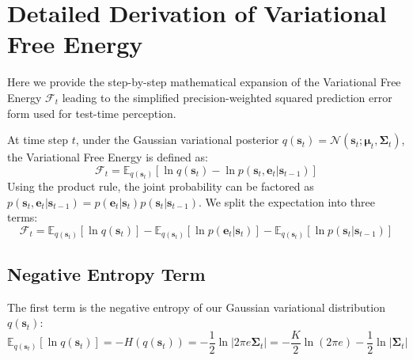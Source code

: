 \documentclass{article}
\theoremstyle{plain}
\theoremstyle{definition}
\theoremstyle{remark}
\begin{document}










\newpage
\appendix
\onecolumn

\section{Detailed Derivation of Variational Free Energy}
\label{app:derivation}

Here we provide the step-by-step mathematical expansion of the Variational Free Energy $\mathcal{F}_t$ leading to the simplified precision-weighted squared prediction error form used for test-time perception. 

At time step $t$, under the Gaussian variational posterior $q(\mathbf{s}_t) = \mathcal{N}(\mathbf{s}_t; \mathbf{\mu}_t, \mathbf{\Sigma}_t)$, the Variational Free Energy is defined as:
\begin{equation}
\mathcal{F}_t = \mathbb{E}_{q(\mathbf{s}_t)} \left[ \ln q(\mathbf{s}_t) - \ln p(\mathbf{s}_t, \mathbf{e}_t | \mathbf{s}_{t-1}) \right]
\end{equation}
Using the product rule, the joint probability can be factored as $p(\mathbf{s}_t, \mathbf{e}_t | \mathbf{s}_{t-1}) = p(\mathbf{e}_t | \mathbf{s}_t) p(\mathbf{s}_t | \mathbf{s}_{t-1})$. We split the expectation into three terms:
\begin{equation}
\mathcal{F}_t = \mathbb{E}_{q(\mathbf{s}_t)} [ \ln q(\mathbf{s}_t) ] - \mathbb{E}_{q(\mathbf{s}_t)} [ \ln p(\mathbf{e}_t | \mathbf{s}_t) ] - \mathbb{E}_{q(\mathbf{s}_t)} [ \ln p(\mathbf{s}_t | \mathbf{s}_{t-1}) ]
\end{equation}

\subsection{Negative Entropy Term}
The first term is the negative entropy of our Gaussian variational distribution $q(\mathbf{s}_t)$:
\begin{equation}
\mathbb{E}_{q(\mathbf{s}_t)} [ \ln q(\mathbf{s}_t) ] = - H(q(\mathbf{s}_t)) = -\frac{1}{2} \ln \left| 2\pi e \mathbf{\Sigma}_t \right| = -\frac{K}{2}\ln(2\pi e) - \frac{1}{2} \ln \left| \mathbf{\Sigma}_t \right|
\end{equation}
\end{document}
